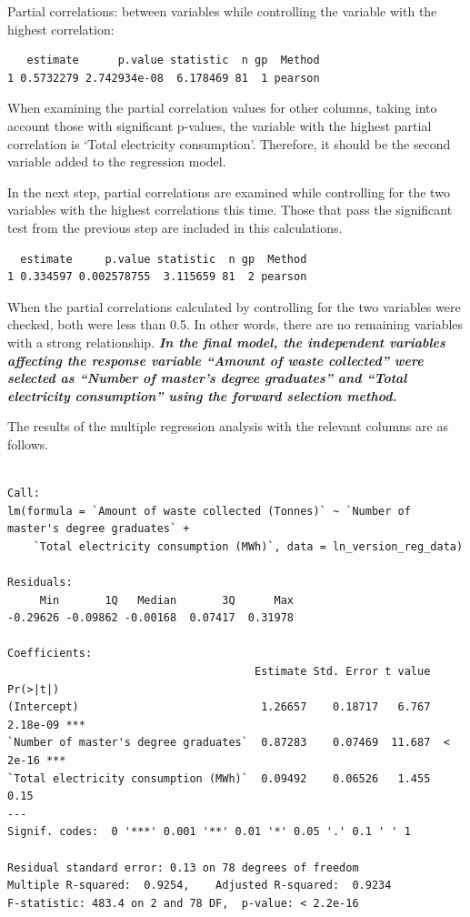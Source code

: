 \documentclass[
  11pt,
  a4paper,
  DIV=11,
  numbers=noendperiod]{scrartcl}
\begin{document}
{Partial correlations}: between variables while controlling the variable
with the highest correlation:

\begin{verbatim}
   estimate      p.value statistic  n gp  Method
1 0.5732279 2.742934e-08  6.178469 81  1 pearson
\end{verbatim}

When examining the partial correlation values for other columns, taking
into account those with significant p-values, {the variable with the
highest partial correlation is `Total electricity consumption'}.
Therefore, it should be the second variable added to the regression
model.

In the next step, partial correlations are examined while controlling
for the two variables with the highest correlations this time. Those
that pass the significant test from the previous step are included in
this calculations.

\begin{verbatim}
  estimate     p.value statistic  n gp  Method
1 0.334597 0.002578755  3.115659 81  2 pearson
\end{verbatim}

When the partial correlations calculated by controlling for the two
variables were checked, both were less than 0.5. In other words, there
are no remaining variables with a strong relationship. \textbf{\emph{In
the final model, the independent variables affecting the response
variable ``Amount of waste collected'' were selected as ``Number of
master's degree graduates'' and ``Total electricity consumption'' using
the forward selection method.}}

The results of the multiple regression analysis with the relevant
columns are as follows.

\begin{verbatim}

Call:
lm(formula = `Amount of waste collected (Tonnes)` ~ `Number of master's degree graduates` + 
    `Total electricity consumption (MWh)`, data = ln_version_reg_data)

Residuals:
     Min       1Q   Median       3Q      Max 
-0.29626 -0.09862 -0.00168  0.07417  0.31978 

Coefficients:
                                      Estimate Std. Error t value Pr(>|t|)    
(Intercept)                            1.26657    0.18717   6.767 2.18e-09 ***
`Number of master's degree graduates`  0.87283    0.07469  11.687  < 2e-16 ***
`Total electricity consumption (MWh)`  0.09492    0.06526   1.455     0.15    
---
Signif. codes:  0 '***' 0.001 '**' 0.01 '*' 0.05 '.' 0.1 ' ' 1

Residual standard error: 0.13 on 78 degrees of freedom
Multiple R-squared:  0.9254,    Adjusted R-squared:  0.9234 
F-statistic: 483.4 on 2 and 78 DF,  p-value: < 2.2e-16
\end{verbatim}
\end{document}
